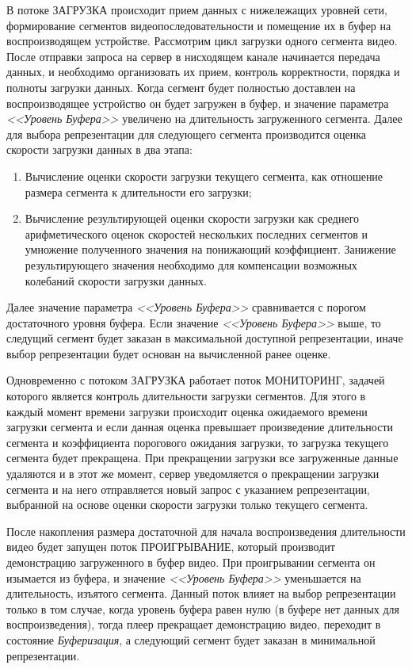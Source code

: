 В потоке ЗАГРУЗКА происходит прием данных с нижележащих уровней сети, формирование сегментов видеопоследовательности и помещение их в буфер на воспроизводящем устройстве. Рассмотрим цикл загрузки одного сегмента видео. После отправки запроса на сервер в нисходящем канале начинается передача данных, и необходимо организовать их прием, контроль корректности, порядка и полноты загрузки данных. Когда сегмент будет полностью доставлен на воспроизводящее устройство он будет загружен в буфер, и значение параметра \textit{<<Уровень Буфера>>} увеличено на длительность загруженного сегмента. Далее для выбора репрезентации для следующего сегмента производится оценка скорости загрузки данных в два этапа:
\begin{enumerate}
  \item Вычисление оценки скорости загрузки текущего сегмента, как отношение размера сегмента к длительности его загрузки;
  \item Вычисление результирующей оценки скорости загрузки как среднего арифметического оценок скоростей нескольких последних сегментов и умножение полученного значения на понижающий коэффициент. Занижение результирующего значения необходимо для компенсации возможных колебаний скорости загрузки данных.
\end{enumerate}
Далее значение параметра \textit{<<Уровень Буфера>>} сравнивается с порогом достаточного уровня буфера. Если значение \textit{<<Уровень Буфера>>} выше, то следущий сегмент будет заказан в максимальной доступной репрезентации, иначе выбор репрезентации будет основан на вычисленной ранее оценке.

Одновременно с потоком ЗАГРУЗКА работает поток МОНИТОРИНГ, задачей которого является контроль длительности загрузки сегментов. Для этого в каждый момент времени загрузки происходит оценка ожидаемого времени загрузки сегмента и если данная оценка превышает произведение длительности сегмента и коэффициента порогового ожидания загрузки, то загрузка текущего сегмента будет прекращена. При прекращении загрузки все загруженные данные удаляются и в этот же момент, сервер уведомляется о прекращении загрузки сегмента и на него отправляется новый запрос с указанием репрезентации, выбранной на основе оценки скорости загрузки только текущего сегмента.

После накопления размера достаточной для начала воспроизведения длительности видео будет запущен поток ПРОИГРЫВАНИЕ, который производит демонстрацию загруженного в буфер видео. При проигрывании сегмента он изымается из буфера, и значение \textit{<<Уровень Буфера>>} уменьшается на длительность, изъятого сегмента. Данный поток влияет на выбор репрезентации только в том случае, когда уровень буфера равен нулю (в буфере нет данных для воспроизведения), тогда плеер прекращает демонстрацию видео, переходит в состояние \textit{Буферизация}, а следующий сегмент будет заказан в минимальной репрезентации.


